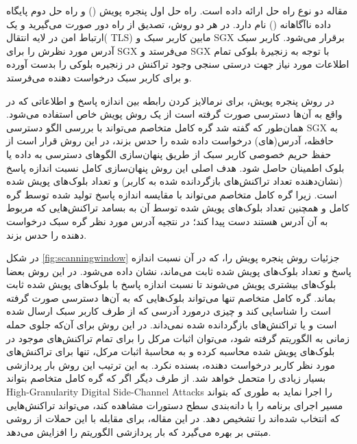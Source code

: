 مقاله \cite{Matetic2019} دو نوع راه حل ارائه داده‌ است. راه حل اول پنجره پویش () و راه حل دوم پایگاه داده ناآگاهانه () نام دارد. در هر دو روش، تصدیق از راه دور صورت می‌گیرید و یک ارتباط امن در لایه انتقال(
TLS)
مابین کاربر سبک و SGX برقرار می‌شود. کاربر سبک آدرس مورد نظرش را برای SGX می‌فرستد و SGX با توجه به زنجیرهٔ بلوکی تمام اطلاعات مورد نیاز جهت درستی سنجی وجود تراکنش در زنجیره بلوکی را بدست آورده و برای کاربر سبک درخواست دهنده می‌فرستد. 

در روش پنجره پویش، برای نرمالایز کردن رابطه بین اندازه پاسخ‌ و اطلاعاتی که در واقع به آن‌ها دسترسی صورت گرفته است از یک روش پویش خاص استفاده می‌شود. همان‌طور که گفته شد گره کامل متخاصم می‌تواند با بررسی الگو دسترسی SGX به حافظه، آدرس(های) درخواست داده شده را حدس بزند، در این روش قرار است از حفظ حریم خصوصی کاربر سبک از طریق پنهان‌سازی الگو‌های دسترسی به داده‌ یا بلوک اطمینان حاصل شود. هدف اصلی این روش پنهان‌سازی کامل نسبت اندازه پاسخ (نشان‌دهنده تعداد تراکنش‌های بازگردانده شده به کاربر) و تعداد بلوک‌های پویش شده است. زیرا گره کامل متخاصم می‌تواند با مقایسه اندازه پاسخ تولید شده توسط گره کامل و همچنین تعداد بلوک‌های پویش شده توسط آن به بسامد تراکنش‌هایی که مربوط به آن آدرس هستند دست پیدا کند؛ در نتجیه آدرس مورد نظر گره سبک درخواست دهنده را حدس بزند.

در شکل \ref{fig:scanningwindow} جزئیات روش پنجره پویش را، که در آن نسبت اندازه پاسخ و تعداد بلوک‌های پویش شده ثابت می‌ماند، نشان داده می‌شود. در این روش بعضا بلوک‌های بیشتری پویش می‌شوند تا نسبت اندازه پاسخ با بلوک‌های پویش شده ثابت بماند. گره کامل متخاصم تنها می‌تواند بلوک‌هایی که به آن‌ها دسترسی صورت گرفته است را شناسایی کند و چیزی درمورد آدرسی که از طرف کاربر سبک ارسال شده است و یا تراکنش‌های بازگردانده شده نمی‌داند. در این روش برای آن‌که جلوی  حمله زمانی به الگوریتم گرفته شود، می‌توان اثبات مرکل را برای تمام تراکنش‌های موجود در بلوک‌های پویش شده محاسبه کرده و به محاسبهٔ اثبات مرکل، تنها برای تراکنش‌های مورد نظر کاربر درخواست دهنده، بسنده نکرد. به این ترتیب این روش بار پردازشی بسیار زیادی را متحمل خواهد شد. از طرف دیگر اگر که گره کامل متخاصم بتواند 
 \gls{High-Granularity Digital Side-Channel Attacks}
را اجرا نماید به طوری که بتواند مسیر اجرای برنامه را با دانه‌بندی سطح دستورات مشاهده کند، می‌تواند تراکنش‌هایی که انتخاب شده‌اند را تشخیص دهد. در این مقاله، برای مقابله با این حملات از روشی مبتنی بر \cite{Rane2015} بهره می‌گیرد که بار پردازشی الگوریتم را افزایش می‌دهد.


